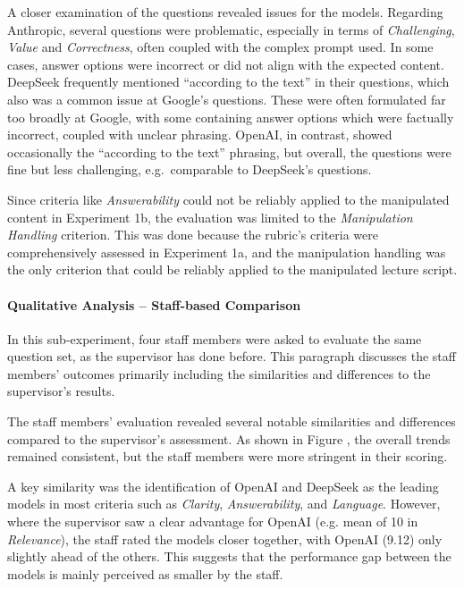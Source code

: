 A closer examination of the questions revealed issues for the models. Regarding Anthropic, several questions were problematic, especially in terms of \textit{Challenging}, \textit{Value} and \textit{Correctness}, often coupled with the complex prompt used. In some cases, answer options were incorrect or did not align with the expected content. DeepSeek frequently mentioned \enquote{according to the text} in their questions, which also was a common issue at Google's questions. These were often formulated far too broadly at Google, with some containing answer options which were factually incorrect, coupled with unclear phrasing. OpenAI, in contrast, showed occasionally the \enquote{according to the text} phrasing, but overall, the questions were fine but less challenging, e.g.\ comparable to DeepSeek's questions.

Since criteria like \textit{Answerability} could not be reliably applied to the manipulated content in Experiment 1b, the evaluation was limited to the \textit{Manipulation Handling} criterion. This was done because the rubric's criteria were comprehensively assessed in Experiment 1a, and the manipulation handling was the only criterion that could be reliably applied to the manipulated lecture script.

\vp


\paragraph*{Qualitative Analysis -- Staff-based Comparison} \label{sec:exp1b-staff-analysis}

In this sub-experiment, four staff members were asked to evaluate the same question set, as the supervisor has done before. This paragraph discusses the staff members' outcomes primarily including the similarities and differences to the supervisor's results.

 The staff members' evaluation revealed several notable similarities and differences compared to the supervisor's assessment. As shown in Figure , the overall trends remained consistent, but the staff members were more stringent in their scoring.

A key similarity was the identification of OpenAI and DeepSeek as the leading models in most criteria such as \textit{Clarity}, \textit{Answerability}, and \textit{Language}. However, where the supervisor saw a clear advantage for OpenAI (e.g. mean of 10 in \textit{Relevance}), the staff rated the models closer together, with OpenAI (9.12) only slightly ahead of the others. This suggests that the performance gap between the models is mainly perceived as smaller by the staff.

